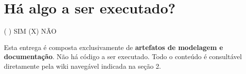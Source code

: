 \documentclass[11pt,a4paper]{article}
\begin{document}
\section{Há algo a ser executado?}

( ) SIM \hspace{1cm} (X) NÃO

\vspace{0.3cm}

Esta entrega é composta exclusivamente de \textbf{artefatos de modelagem e documentação}. Não há código a ser executado. Todo o conteúdo é consultável diretamente pela wiki navegável indicada na seção 2.
\end{document}
